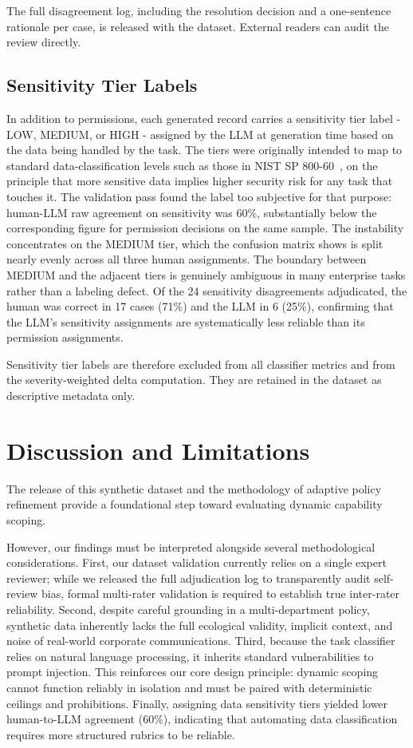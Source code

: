 \documentclass{article}
\theoremstyle{plain}
\theoremstyle{definition}
\theoremstyle{remark}
\begin{document}
The full disagreement log, including the resolution decision and a 
one-sentence rationale per case, is released with the dataset. 
External readers can audit the review directly.


\subsection{Sensitivity Tier Labels}
In addition to permissions, each generated record carries a sensitivity tier label - LOW, MEDIUM, or HIGH - assigned by the LLM at generation time based on the data being handled by the task. The tiers were originally intended to map to standard data-classification levels such as those in NIST SP 800-60~\citep{nist80060}, on the principle that more sensitive data implies higher security risk for any task that touches it. The validation pass found the label too subjective for that purpose: human-LLM raw agreement on sensitivity was 60\%, substantially below the corresponding figure for permission decisions on the same sample. The instability concentrates on the MEDIUM tier, which the confusion matrix shows is split nearly evenly across all three human assignments. The boundary between MEDIUM and the adjacent tiers is genuinely ambiguous in many enterprise tasks rather than a labeling defect. Of the 24 sensitivity disagreements adjudicated, the human was correct in 17 cases (71\%) and the LLM in 6 (25\%), confirming that the LLM's sensitivity assignments are systematically less reliable than its permission assignments.

Sensitivity tier labels are therefore excluded from all classifier metrics and from the severity-weighted delta computation. They are retained in the dataset as descriptive metadata only.

\section{Discussion and Limitations}

The release of this synthetic dataset and the methodology of adaptive policy refinement provide a foundational step toward evaluating dynamic capability scoping.

However, our findings must be interpreted alongside several methodological considerations. First, our dataset validation currently relies on a single expert reviewer; while we released the full adjudication log to transparently audit self-review bias, formal multi-rater validation is required to establish true inter-rater reliability. Second, despite careful grounding in a multi-department policy, synthetic data inherently lacks the full ecological validity, implicit context, and noise of real-world corporate communications. Third, because the task classifier relies on natural language processing, it inherits standard vulnerabilities to prompt injection. This reinforces our core design principle: dynamic scoping cannot function reliably in isolation and must be paired with deterministic ceilings and prohibitions. Finally, assigning data sensitivity tiers yielded lower human-to-LLM agreement (60\%), indicating that automating data classification requires more structured rubrics to be reliable.
\end{document}
